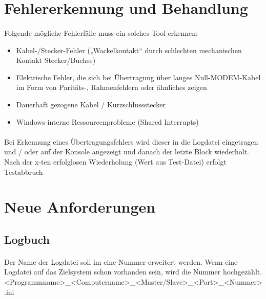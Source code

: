 \section{Fehlererkennung und Behandlung}
\paragraph{}
Folgende mögliche Fehlerfälle muss ein solches Tool erkennen:
\begin{itemize}
\item Kabel-/Stecker-Fehler („Wackelkontakt“ durch schlechten mechanischen Kontakt Stecker/Buchse) 
\item Elektrische Fehler, die sich bei Übertragung über langes Null-MODEM-Kabel im Form von Paritäts-, Rahmenfehlern oder ähnliches zeigen
\item Dauerhaft gezogene Kabel / Kurzschlussstecker
\item Windows-interne Ressourcenprobleme (Shared Interrupts)
\end{itemize} 
\paragraph{}
Bei Erkennung eines Übertragungsfehlers wird dieser in die Logdatei eingetragen und / oder auf der Konsole angezeigt und danach der letzte Block wiederholt. Nach der x-ten erfolglosen Wiederholung (Wert aus Test-Datei) erfolgt Testabbruch

\newpage

\section{Neue Anforderungen}
\subsection{Logbuch}
\paragraph{}
Der Name der Logdatei soll im eine Nummer erweitert werden. Wenn eine Logdatei auf das Zielsystem schon vorhanden sein, wird die Nummer hochgezählt.\\

\hspace*{10mm}<Programmname>\_<Computername>\_<Master/Slave>\_<Port>\_<Nummer>.ini

